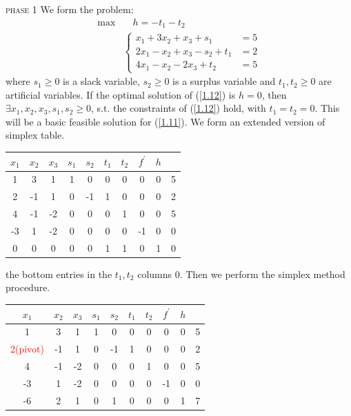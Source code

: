 \noindent\textcolor{MarkerColour}{\large\textsc{phase 1}} We form the problem:
\begin{align}
    \max &\quad h = -t_1 - t_2 \nonumber\\
    & \left\lbrace\begin{array}{ll}
        x_1+3x_2+x_3 + s_1 &= 5  \\
        2x_1 - x_2 + x_3 - s_2 + t_1&= 2\\
        4x_1 - x_2 -2x_3 + t_2 & = 5
    \end{array} \right.\label{1.12}
\end{align}
where $s_1\ge 0$ is a slack variable, $s_2 \ge 0$ is a surplus variable and $t_1, t_2\ge 0$ are artificial variables. If the optimal solution of (\ref{1.12}) is $h=0$, then $\exists x_1, x_2, x_3, s_1, s_2\ge 0$, s.t. the constraints of (\ref{1.12}) hold, with $t_1 = t_2 = 0$. This will be a basic feasible solution for (\ref{1.11}). We form an extended version of simplex table.
\begin{table}[H]
        \centering
        \begin{tabular}{|ccccccccc|c|}
        \hline
        $x_1$ & $x_2$ & $x_3$ & $s_1$ & $s_2$& $t_1$ & $t_2$ & $f^{\prime}$ & $h$ & \\ \hline
        1 & 3 & 1 & 1 & 0 & 0 & 0 & 0 & 0 & 5 \\
        2 & -1 & 1 & 0 & -1 & 1 & 0 & 0 & 0 & 2\\ 
        4 & -1 & -2 & 0 & 0 & 0 & 1& 0 & 0 & 5\\ \hline
        -3 & 1 & -2 & 0 & 0 & 0 & 0 & -1 & 0 & 0 \\ 
        0 & 0& 0& 0& 0 & 1 & 1& 0 & 1& 0\\ \hline
        \end{tabular}
        \label{tab-12-1}
\end{table}
the bottom entries in the $t_1, t_2$ columns 0. Then we perform the simplex method procedure.
\begin{table}[H]
        \centering
        \begin{tabular}{|ccccccccc|c|}
        \hline
        $x_1$ & $x_2$ & $x_3$ & $s_1$ & $s_2$& $t_1$ & $t_2$ & $f^{\prime}$ & $h$ & \\ \hline
        1 & 3 & 1 & 1 & 0 & 0 & 0 & 0 & 0 & 5 \\
        \textcolor{red}{2(pivot)} & -1 & 1 & 0 & -1 & 1 & 0 & 0 & 0 & 2\\ 
        4 & -1 & -2 & 0 & 0 & 0 & 1& 0 & 0 & 5\\ \hline
        -3 & 1 & -2 & 0 & 0 & 0 & 0 & -1 & 0 & 0 \\ 
        -6 & 2 & 1 & 0 & 1 & 0 & 0 & 0 & 1 & 7\\ \hline
        \end{tabular}
        \label{tab-12-2}
\end{table}
